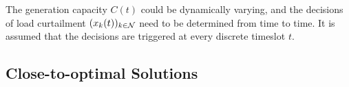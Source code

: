 





The generation capacity $C(t)$ could be dynamically varying, and the decisions of load curtailment $(x_k(t))_{k \in {\cal N}}$ need to be determined from time to time. It is assumed that the decisions are triggered at every discrete timeslot $t$. 


\vspace{-5pt}
\subsection{Close-to-optimal Solutions}

